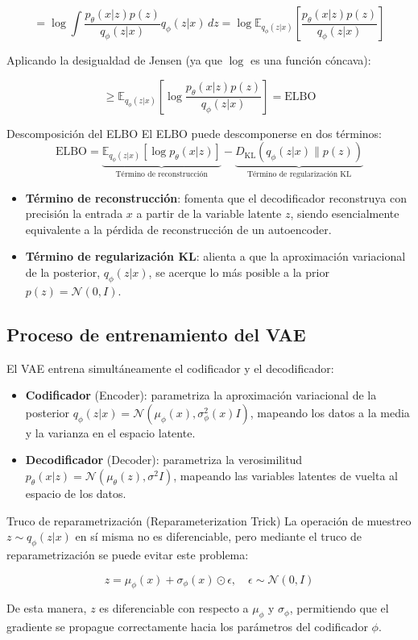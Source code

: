 $$= \log \int \frac{p_\theta(x|z) p(z)}{q_\phi(z|x)} q_\phi(z|x) \, dz = \log \mathbb{E}_{q_\phi(z|x)} \left[ \frac{p_\theta(x|z) p(z)}{q_\phi(z|x)} \right]$$

Aplicando la desigualdad de Jensen (ya que $\log$ es una función cóncava):

$$\geq \mathbb{E}_{q_\phi(z|x)} \left[ \log \frac{p_\theta(x|z) p(z)}{q_\phi(z|x)} \right] = \text{ELBO}$$

\begin{importantbox}{Descomposición del ELBO}
El ELBO puede descomponerse en dos términos:
$$\text{ELBO} = \underbrace{\mathbb{E}_{q_\phi(z|x)}[\log p_\theta(x|z)]}_{\text{Término de reconstrucción}} - \underbrace{D_{\text{KL}}(q_\phi(z|x) \| p(z))}_{\text{Término de regularización KL}}$$

\begin{itemize}
    \item \textbf{Término de reconstrucción}: fomenta que el decodificador reconstruya con precisión la entrada $x$ a partir de la variable latente $z$, siendo esencialmente equivalente a la pérdida de reconstrucción de un autoencoder.
    \item \textbf{Término de regularización KL}: alienta a que la aproximación variacional de la posterior, $q_\phi(z|x)$, se acerque lo más posible a la prior $p(z) = \mathcal{N}(0, I)$.
\end{itemize}
\end{importantbox}

\subsection{Proceso de entrenamiento del VAE}

El VAE entrena simultáneamente el codificador y el decodificador:

\begin{itemize}
    \item \textbf{Codificador} (Encoder): parametriza la aproximación variacional de la posterior $q_\phi(z|x) = \mathcal{N}(\mu_\phi(x), \sigma^2_\phi(x) I)$, mapeando los datos a la media y la varianza en el espacio latente.
    \item \textbf{Decodificador} (Decoder): parametriza la verosimilitud $p_\theta(x|z) = \mathcal{N}(\mu_\theta(z), \sigma^2 I)$, mapeando las variables latentes de vuelta al espacio de los datos.
\end{itemize}

\begin{knowledgebox}{Truco de reparametrización (Reparameterization Trick)}
La operación de muestreo $z \sim q_\phi(z|x)$ en sí misma no es diferenciable, pero mediante el truco de reparametrización se puede evitar este problema:

$$z = \mu_\phi(x) + \sigma_\phi(x) \odot \epsilon, \quad \epsilon \sim \mathcal{N}(0, I)$$

De esta manera, $z$ es diferenciable con respecto a $\mu_\phi$ y $\sigma_\phi$, permitiendo que el gradiente se propague correctamente hacia los parámetros del codificador $\phi$.
\end{knowledgebox}

